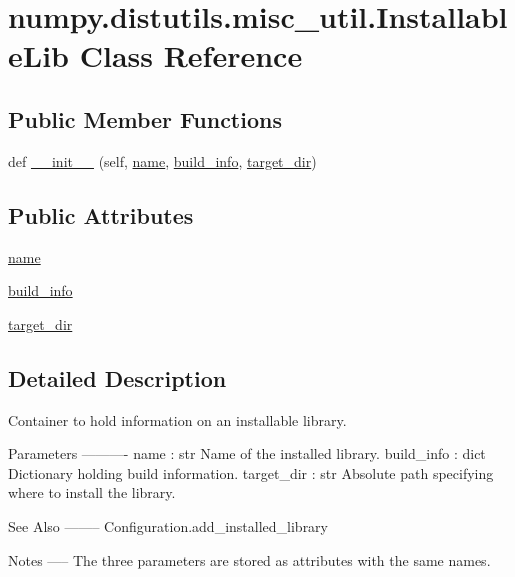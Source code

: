\hypertarget{classnumpy_1_1distutils_1_1misc__util_1_1InstallableLib}{}\section{numpy.\+distutils.\+misc\+\_\+util.\+Installable\+Lib Class Reference}
\label{classnumpy_1_1distutils_1_1misc__util_1_1InstallableLib}
\subsection*{Public Member Functions}
\begin{DoxyCompactItemize}
\item 
def \hyperlink{classnumpy_1_1distutils_1_1misc__util_1_1InstallableLib_af0e21af3e5ec674e2bc3782dd862a833}{\+\_\+\+\_\+init\+\_\+\+\_\+} (self, \hyperlink{classnumpy_1_1distutils_1_1misc__util_1_1InstallableLib_a0e09b409a748b85cb0e0734fcd5070d6}{name}, \hyperlink{classnumpy_1_1distutils_1_1misc__util_1_1InstallableLib_a6100784f6b4e679ddc70eb8910a5837f}{build\+\_\+info}, \hyperlink{classnumpy_1_1distutils_1_1misc__util_1_1InstallableLib_aaf3f0550a1102d8623d142e2d76cd6c8}{target\+\_\+dir})
\end{DoxyCompactItemize}
\subsection*{Public Attributes}
\begin{DoxyCompactItemize}
\item 
\hyperlink{classnumpy_1_1distutils_1_1misc__util_1_1InstallableLib_a0e09b409a748b85cb0e0734fcd5070d6}{name}
\item 
\hyperlink{classnumpy_1_1distutils_1_1misc__util_1_1InstallableLib_a6100784f6b4e679ddc70eb8910a5837f}{build\+\_\+info}
\item 
\hyperlink{classnumpy_1_1distutils_1_1misc__util_1_1InstallableLib_aaf3f0550a1102d8623d142e2d76cd6c8}{target\+\_\+dir}
\end{DoxyCompactItemize}


\subsection{Detailed Description}
\begin{DoxyVerb}Container to hold information on an installable library.

Parameters
----------
name : str
    Name of the installed library.
build_info : dict
    Dictionary holding build information.
target_dir : str
    Absolute path specifying where to install the library.

See Also
--------
Configuration.add_installed_library

Notes
-----
The three parameters are stored as attributes with the same names.\end{DoxyVerb}
 

